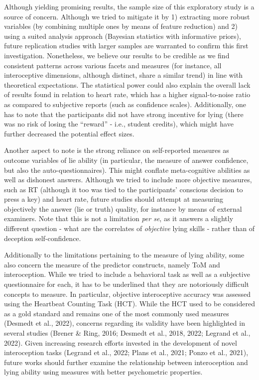 \documentclass[
  man,mask,floatsintext]{apa6}
\begin{document}
Although yielding promising results, the sample size of this exploratory study is a source of concern. Although we tried to mitigate it by 1) extracting more robust variables (by combining multiple ones by means of feature reduction) and 2) using a suited analysis approach (Bayesian statistics with informative priors), future replication studies with larger samples are warranted to confirm this first investigation. Nonetheless, we believe our results to be credible as we find consistent patterns across various facets and measures (for instance, all interoceptive dimensions, although distinct, share a similar trend) in line with theoretical expectations. The statistical power could also explain the overall lack of results found in relation to heart rate, which has a higher signal-to-noise ratio as compared to subjective reports (such as confidence scales). Additionally, one has to note that the participants did not have strong incentive for lying (there was no risk of losing the ``reward'' - i.e., student credits), which might have further decreased the potential effect sizes.

Another aspect to note is the strong reliance on self-reported measures as outcome variables of lie ability (in particular, the measure of answer confidence, but also the auto-questionnaires). This might conflate meta-cognitive abilities as well as dishonest answers. Although we tried to include more objective measures, such as RT (although it too was tied to the participants' conscious decision to press a key) and heart rate, future studies should attempt at measuring objectively the answer (lie or truth) quality, for instance by means of external examiners. Note that this is not a limitation \emph{per se}, as it answers a slightly different question - what are the correlates of \emph{objective} lying skills - rather than of deception self-confidence.

Additionally to the limitations pertaining to the measure of lying ability, some also concern the measure of the predictor constructs, namely ToM and interoception. While we tried to include a behavioral task as well as a subjective questionnaire for each, it has to be underlined that they are notoriously difficult concepts to measure. In particular, objective interoceptive accuracy was assessed using the Heartbeat Counting Task (HCT). While the HCT used to be considered as a gold standard and remains one of the most commonly used measures (Desmedt et al., 2022), concerns regarding its validity have been highlighted in several studies (Brener \& Ring, 2016; Desmedt et al., 2018, 2022; Legrand et al., 2022). Given increasing research efforts invested in the development of novel interoception tasks (Legrand et al., 2022; Plans et al., 2021; Ponzo et al., 2021), future works should further examine the relationship between interoception and lying ability using measures with better psychometric properties.
\end{document}

